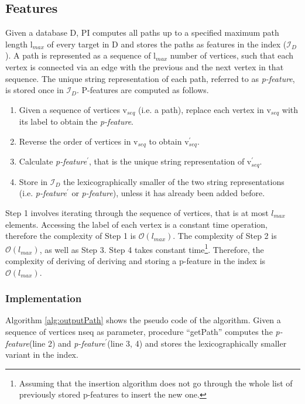 \documentclass{l4proj}
\newcommand{\fancyI}{\mathcal{I}}
\begin{document}
\subsection{Features}
\label{pi:features}
Given a database D, PI computes all paths up to a specified maximum path length l$_{max}$ of every target in D and stores the paths as features in the index ($\fancyI_{D}$). A path is represented as a sequence of l$_{max}$ number of vertices, such that each vertex is connected via an edge with the previous and the next vertex in that sequence. The unique string representation of each path, referred to as \emph{p-feature}, is stored once in $\fancyI_{D}$. P-features are computed as follows.
\begin{enumerate}
\item Given a sequence of vertices v$_{seq}$ (i.e. a path), replace each vertex in v$_{seq}$ with its label to obtain the \emph{p-feature}.
\item Reverse the order of vertices in v$_{seq}$ to obtain v$_{seq}^{\prime}$.
\item Calculate \emph{p-feature}$^{\prime}$, that is the unique string representation of v$_{seq}^{\prime}$.
\item Store in $\fancyI_{D}$ the lexicographically smaller of the two string representations (i.e. \emph{p-feature}$^{\prime}$ or \emph{p-feature}), unless it has already been added before.
\end{enumerate}
Step 1 involves iterating through the sequence of vertices, that is at most $l_{max}$ elements. Accessing the label of each vertex is a constant time operation, therefore the complexity of Step 1 is $\mathcal{O}(l_{max})$. The complexity of Step 2 is $\mathcal{O}(l_{max})$, as well as Step 3. Step 4 takes constant time\footnote{Assuming that the insertion algorithm does not go through the whole list of previously stored p-features to insert the new one.}. Therefore, the complexity of deriving of deriving and storing a p-feature in the index is $\mathcal{O}(l_{max})$.
\subsubsection{Implementation}
\label{pi:featuresImpl}
Algorithm \ref{alg:outputPath} shows the pseudo code of the algorithm. Given a sequence of vertices nseq as parameter, procedure ``getPath'' computes the \emph{p-feature}(line 2) and \emph{p-feature}$^{\prime}$(line 3, 4) and stores the lexicographically smaller variant in the index.
\end{document}
